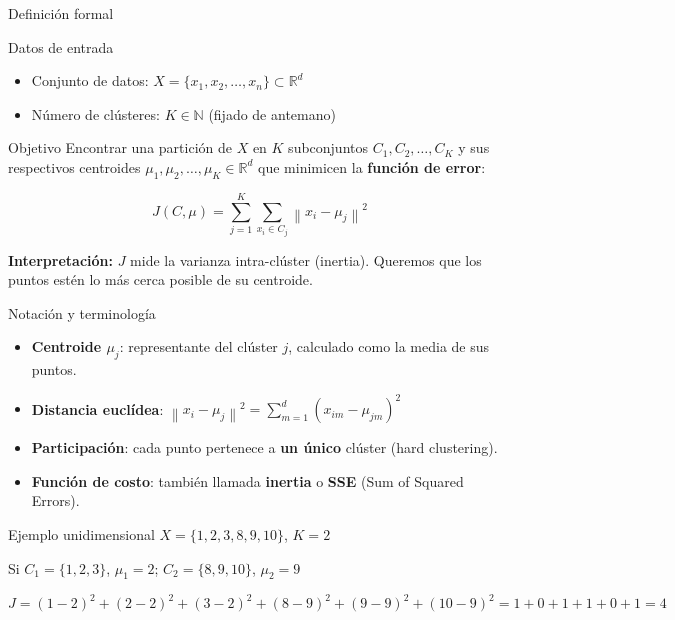\documentclass[aspectratio=169]{beamer}
\newcommand{\R}{\mathbb{R}}
\newcommand{\norm}[1]{\left\lVert #1 \right\rVert}
\begin{document}
\begin{frame}{Definición formal}
    \begin{block}{Datos de entrada}
        \begin{itemize}
            \item Conjunto de datos: \(X = \{x_1, x_2, \ldots, x_n\} \subset \R^d\)
            \item Número de clústeres: \(K \in \mathbb{N}\) (fijado de antemano)
        \end{itemize}
    \end{block}
    
    \begin{block}{Objetivo}
        Encontrar una partición de \(X\) en \(K\) subconjuntos \(C_1, C_2, \ldots, C_K\) y sus respectivos centroides \(\mu_1, \mu_2, \ldots, \mu_K \in \R^d\) que minimicen la \textbf{función de error}:
        
        \[
        J(C, \mu) = \sum_{j=1}^{K} \sum_{x_i \in C_j} \norm{x_i - \mu_j}^2
        \]
    \end{block}
    
    \pause
    \textbf{Interpretación:} \(J\) mide la varianza intra-clúster (inertia). Queremos que los puntos estén lo más cerca posible de su centroide.
\end{frame}

\begin{frame}{Notación y terminología}
    \begin{itemize}
        \item \textbf{Centroide \(\mu_j\)}: representante del clúster \(j\), calculado como la media de sus puntos.
        \item \textbf{Distancia euclídea}: \(\norm{x_i - \mu_j}^2 = \sum_{m=1}^d (x_{im} - \mu_{jm})^2\)
        \item \textbf{Participación}: cada punto pertenece a \textbf{un único} clúster (hard clustering).
        \item \textbf{Función de costo}: también llamada \textbf{inertia} o \textbf{SSE} (Sum of Squared Errors).
    \end{itemize}
    
    \begin{exampleblock}{Ejemplo unidimensional}
        \(X = \{1, 2, 3, 8, 9, 10\}\), \(K=2\)
        
        Si \(C_1 = \{1,2,3\}\), \(\mu_1 = 2\); \(C_2 = \{8,9,10\}\), \(\mu_2 = 9\)
        
        \(J = (1-2)^2 + (2-2)^2 + (3-2)^2 + (8-9)^2 + (9-9)^2 + (10-9)^2 = 1+0+1+1+0+1 = 4\)
    \end{exampleblock}
\end{frame}
\end{document}
